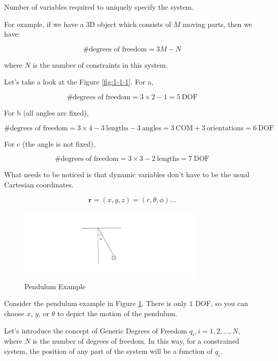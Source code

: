 \begin{definition}
    Number of variables required to uniquely specify the system.
\end{definition}

For example, if we have a 3D object which consists of $M$ moving parts, then we have:

\[
    \text{\# degrees of freedom} = 3M -N
\]

where $N$ is the number of constraints in this system.

Let's take a look at the Figure \ref{fig:1-1-1}. For a, 

\[
    \text{\# degrees of freedom} = 3 \times 2 - 1 = 5 \ \text{DOF}
\]

For b (all angles are fixed),

\[
    \text{\# degrees of freedom} = 3 \times 4 - 3 \ \text{lengths} - 3 \ \text{angles} = 3 \ \text{COM} + 3 \ \text{orientations} = 6 \ \text{DOF}
\]

For c (the angle is not fixed),

\[
    \text{\# degrees of freedom} = 3 \times 3 - 2 \ \text{lengths} = 7 \ \text{DOF}
\]

What needs to be noticed is that dynamic variables don't have to be the usual Cartesian coordinates.

\[
    \mathbf{r} = (x, y, z) = (r, \theta, \phi) ...
\]

\begin{figure}[ht]
  \centering
  \includegraphics[width=0.8\textwidth]{images/1-1-2.png}
  \caption{Pendulum Example}
  \label{fig:1-1-2}
\end{figure}

Consider the pendulum example in Figure \ref{fig:1-1-2}. There is only $1$ DOF, so you can choose $x$, $y$, or $\theta$ to depict the motion of the pendulum.

Let's introduce the concept of Generic Degrees of Freedom $q_i, i=1, 2, ..., N$, where $N$ is the number of degrees of freedom. In this way, for a constrained system, the position of any part of the system will be a function of $q_i$.

